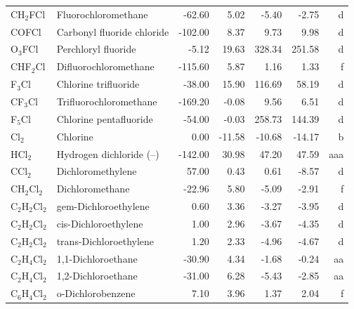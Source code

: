 \begin{table}
\begin{center}
\begin{tabular}{llrrrrr}
 CH$_2$FCl      & Fluorochloromethane             &   -62.60    &     5.02  &    -5.40  &    -2.75  &      d\\
 COFCl       & Carbonyl fluoride chloride      &  -102.00    &     8.37  &     9.73  &     9.98  &      d\\
 O$_3$FCl       & Perchloryl fluoride             &    -5.12    &    19.63  &   328.34  &   251.58  &      d\\
 CHF$_2$Cl      & Difluorochloromethane           &  -115.60    &     5.87  &     1.16  &     1.33  &      f\\
 F$_3$Cl        & Chlorine trifluoride            &   -38.00    &    15.90  &   116.69  &    58.19  &      d\\
 CF$_3$Cl       & Trifluorochloromethane          &  -169.20    &    -0.08  &     9.56  &     6.51  &      d\\
 F$_5$Cl        & Chlorine pentafluoride          &   -54.00    &    -0.03  &   258.73  &   144.39  &      d\\
 Cl$_2$         & Chlorine                        &     0.00    &   -11.58  &   -10.68  &   -14.17  &      b\\
 HCl$_2$        & Hydrogen dichloride (--)         &  -142.00    &    30.98  &    47.20  &    47.59  &    aaa\\
 CCl$_2$        & Dichloromethylene               &    57.00    &     0.43  &     0.61  &    -8.57  &      d\\
 CH$_2$Cl$_2$      & Dichloromethane                 &   -22.96    &     5.80  &    -5.09  &    -2.91  &      f\\
 C$_2$H$_2$Cl$_2$     & gem-Dichloroethylene            &     0.60    &     3.36  &    -3.27  &    -3.95  &      d\\
 C$_2$H$_2$Cl$_2$     & cis-Dichloroethylene            &     1.00    &     2.96  &    -3.67  &    -4.35  &      d\\
 C$_2$H$_2$Cl$_2$     & trans-Dichloroethylene          &     1.20    &     2.33  &    -4.96  &    -4.67  &      d\\
 C$_2$H$_4$Cl$_2$     & 1,1-Dichloroethane              &   -30.90    &     4.34  &    -1.68  &    -0.24  &     aa\\
 C$_2$H$_4$Cl$_2$     & 1,2-Dichloroethane              &   -31.00    &     6.28  &    -5.43  &    -2.85  &     aa\\
 C$_6$H$_4$Cl$_2$     & o-Dichlorobenzene               &     7.10    &     3.96  &     1.37  &     2.04  &      f\\

\end{tabular}
\end{center}
\end{table}
